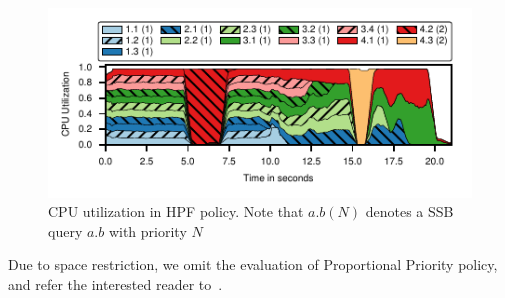 \begin{figure}[t]
	\centering
	\includegraphics[width=\columnwidth]{policy/figures/ssb-hpf-all.pdf}
	\caption{CPU utilization in HPF policy. Note that $a.b  (N)$ denotes a SSB query $a.b$ with priority $N$}
	\label{fig:hpf-all}
\end{figure}

Due to space restriction, we omit the evaluation of Proportional Priority policy, and refer the interested reader to~\cite{supplement}.
%
%
%
